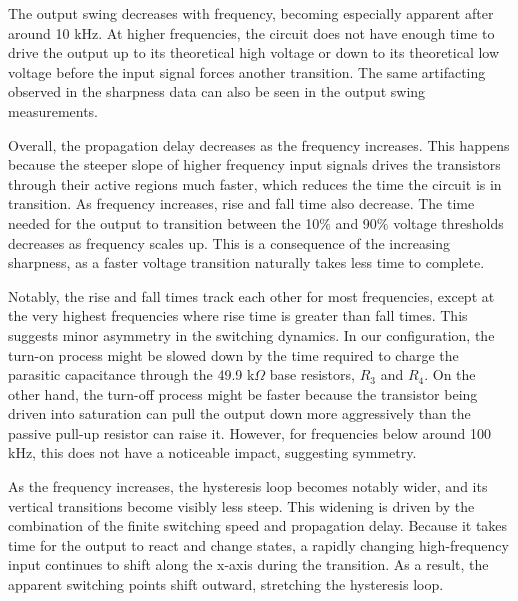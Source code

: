 \documentclass[9pt,a4paper,twoside]{tau-class/tau}
\begin{document}
	The output swing decreases with frequency, becoming especially apparent after around 10 kHz. At higher frequencies, the circuit does not have enough time to drive the output up to its theoretical high voltage or down to its theoretical low voltage before the input signal forces another transition. The same artifacting observed in the sharpness data can also be seen in the output swing measurements.

	Overall, the propagation delay decreases as the frequency increases. This happens because the steeper slope of higher frequency input signals drives the transistors through their active regions much faster, which reduces the time the circuit is in transition. As frequency increases, rise and fall time also decrease. The time needed for the output to transition between the 10\% and 90\% voltage thresholds decreases as frequency scales up. This is a consequence of the increasing sharpness, as a faster voltage transition naturally takes less time to complete. 

	Notably, the rise and fall times track each other for most frequencies, except at the very highest frequencies where rise time is greater than fall times. This suggests minor asymmetry in the switching dynamics. In our configuration, the turn-on process might be slowed down by the time required to charge the parasitic capacitance through the 49.9 k\(\Omega\) base resistors, $R_3$ and $R_4$. On the other hand, the turn-off process might be faster because the transistor being driven into saturation can pull the output down more aggressively than the passive pull-up resistor can raise it. However, for frequencies below around 100 kHz, this does not have a noticeable impact, suggesting symmetry.

	As the frequency increases, the hysteresis loop becomes notably wider, and its vertical transitions become visibly less steep. This widening is driven by the combination of the finite switching speed and propagation delay. Because it takes time for the output to react and change states, a rapidly changing high-frequency input continues to shift along the x-axis during the transition. As a result, the apparent switching points shift outward, stretching the hysteresis loop.
\end{document}
